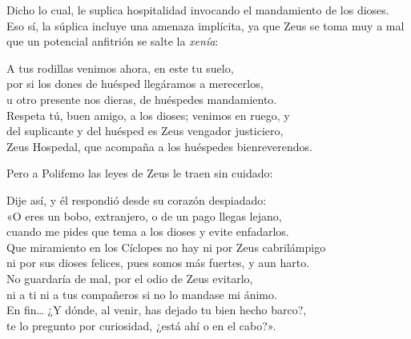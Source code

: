Dicho lo cual, le suplica hospitalidad invocando el mandamiento de los dioses. Eso sí, la súplica incluye una amenaza implícita, ya que Zeus se toma muy a mal que un potencial anfitrión se salte la \emph{xenía}:

\begin{versocita}
A tus rodillas venimos ahora, en este tu suelo,\\
por si los dones de huésped llegáramos a merecerlos,\\
u otro presente nos dieras, de huéspedes mandamiento.\\
Respeta tú, buen amigo, a los dioses; venimos en ruego, y\\
del suplicante y del huésped es Zeus vengador justiciero,\\
Zeus Hospedal, que acompaña a los huéspedes bienreverendos.
\end{versocita}

Pero a Polifemo las leyes de Zeus le traen sin cuidado:

\begin{versocita}
Dije así, y él respondió desde su corazón despiadado:\\
«O eres un bobo, extranjero, o de un pago llegas lejano,\\
cuando me pides que tema a los dioses y evite enfadarlos.\\
Que miramiento en los Cíclopes no hay ni por Zeus cabrilámpigo\\
ni por sus dioses felices, pues somos más fuertes, y aun harto.\\
No guardaría de mal, por el odio de Zeus evitarlo,\\
ni a ti ni a tus compañeros si no lo mandase mi ánimo.\\
En fin… ¿Y dónde, al venir, has dejado tu bien hecho barco?,\\
te lo pregunto por curiosidad, ¿está ahí o en el cabo?».
\end{versocita}

